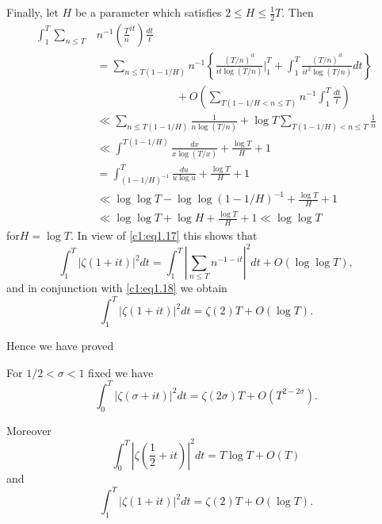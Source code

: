 Finally, let $H$ be a parameter which satisfies $2 \leq H \leq
\frac{1}{2} T$. Then
\begin{align*}
  \int^T_1 \sum_{n \leq T}& n^{-1}
  \left(\frac{T}{n}^{it }\right) \frac{dt}{t}\\
  & = \sum_{n \leq
    T(1-1/H)} n^{-1} \left\{\frac{(T/n)^{it }}{it  \log
    (T/n)} \Big|^T_1 + \int^T_1 \frac{(T/n)^{it }}{it ^2
    \log (T/n)} dt \right\}\\
  & \hspace{3cm}+ O\left( \sum_{T(1-1/H < n\leq T)} n^{-1} \int^T_1
  \frac{dt}{t}\right)\\
  & \ll \sum_{n \leq T (1-1/H)} \frac{1}{n \log (T/n)}+ \log T
  \sum_{T(1-1 /H) < n \leq T} \frac{1}{n}\\
  & \ll \int^{T(1-1/H)} \frac{dx}{x \log (T/x)} + \frac{\log T}{H} + 1\\
  & = \int^T_{(1-1/H)^{-1}} \frac{du}{u \log u} + \frac{\log T}{H} + 1\\
  & \ll \log \log T - \log \log (1-1/H)^{-1}+ \frac{\log T}{H} +1\\
  & \ll \log \log T + \log H + \frac{\log T}{H} + 1 \ll \log \log T  
\end{align*}
for\pageoriginale $H= \log T$. In view of \eqref{c1:eq1.17} this shows
that 
\begin{equation}
  \int^{T}_1 |\zeta (1 + it )|^2 dt = \int^T_1 \left| \sum_{n
    \leq T} n^{-1- it } \right|^2 dt + O (\log \log T), \label{c1:eq1.19}
\end{equation}
and in conjunction with \eqref{c1:eq1.18} we obtain
$$
\int^T_1 |\zeta (1+ it )|^2 dt = \zeta(2) T + O (\log T).
$$

Hence we have proved
\begin{thm}\label{c1:thm1.1}
  For $1/2 < \sigma < 1$ fixed we have
  \begin{equation}
    \int^T_0 |\zeta (\sigma + it )|^2 dt = \zeta (2 \sigma) T+ O
    (T^{2- 2 \sigma}).\label{c1:eq1.20}
  \end{equation}
\end{thm}

Moreover 
\begin{equation}
  \int^T_0 |\zeta (\frac{1}{2}+ it )|^2 dt = T \log T + O
  (T)\label{c1:eq1.21} 
\end{equation}
and 
\begin{equation}
  \int^T_1 |\zeta (1 + it )|^2dt = \zeta (2) T + O (\log
  T).\label{c1:eq1.22}
\end{equation}

